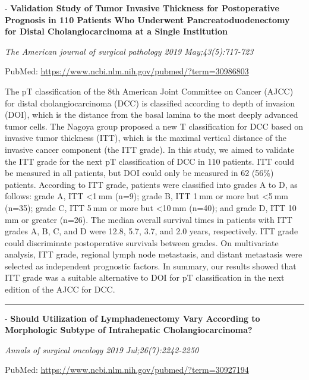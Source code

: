 \documentclass[]{article}
\begin{document}
 - \textbf{Validation Study of Tumor Invasive Thickness for
Postoperative Prognosis in 110 Patients Who Underwent
Pancreatoduodenectomy for Distal Cholangiocarcinoma at a Single
Institution}

\emph{The American journal of surgical pathology 2019 May;43(5):717-723}

PubMed: \url{https://www.ncbi.nlm.nih.gov/pubmed/?term=30986803}

The pT classification of the 8th American Joint Committee on Cancer
(AJCC) for distal cholangiocarcinoma (DCC) is classified according to
depth of invasion (DOI), which is the distance from the basal lamina to
the most deeply advanced tumor cells. The Nagoya group proposed a new T
classification for DCC based on invasive tumor thickness (ITT), which is
the maximal vertical distance of the invasive cancer component (the ITT
grade). In this study, we aimed to validate the ITT grade for the next
pT classification of DCC in 110 patients. ITT could be measured in all
patients, but DOI could only be measured in 62 (56\%) patients.
According to ITT grade, patients were classified into grades A to D, as
follows: grade A, ITT \textless{}1 mm (n=9); grade B, ITT 1 mm or more
but \textless{}5 mm (n=35); grade C, ITT 5 mm or more but
\textless{}10 mm (n=40); and grade D, ITT 10 mm or greater (n=26). The
median overall survival times in patients with ITT grades A, B, C, and D
were 12.8, 5.7, 3.7, and 2.0 years, respectively. ITT grade could
discriminate postoperative survivals between grades. On multivariate
analysis, ITT grade, regional lymph node metastasis, and distant
metastasis were selected as independent prognostic factors. In summary,
our results showed that ITT grade was a suitable alternative to DOI for
pT classification in the next edition of the AJCC for DCC.

{}

{}

\begin{center}\rule{0.5\linewidth}{\linethickness}\end{center}

 - \textbf{Should Utilization of Lymphadenectomy Vary According to
Morphologic Subtype of Intrahepatic Cholangiocarcinoma?}

\emph{Annals of surgical oncology 2019 Jul;26(7):2242-2250}

PubMed: \url{https://www.ncbi.nlm.nih.gov/pubmed/?term=30927194}
\end{document}
